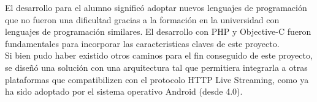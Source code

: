 El desarrollo para el alumno significó adoptar nuevos lenguajes de programación que no fueron una dificultad gracias a la formación en la universidad con lenguajes de programación similares. El desarrollo con PHP y Objective-C fueron fundamentales para incorporar las caracteristicas claves de este proyecto.\\

Si bien pudo haber existido otros caminos para el fin conseguido de este proyecto, se diseñó una solución con una arquitectura tal que permitiera integrarla a otras plataformas que compatibilizen con el protocolo HTTP Live Streaming, como ya ha sido adoptado por el sistema operativo Android (desde 4.0). \\





	
		
	

